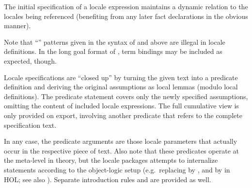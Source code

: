 \begin{isabellebody}
\begin{isamarkuptext}
\begin{description}
\begin{description}
  The initial  specification of a locale expression
  maintains a dynamic relation to the locales being referenced
  (benefiting from any later fact declarations in the obvious manner).

  \end{description}
  
  Note that ``'' patterns given
  in the syntax of \hyperlink{element.assumes}{\mbox{}} and \hyperlink{element.defines}{\mbox{}} above
  are illegal in locale definitions.  In the long goal format of
  , term bindings may be included as expected,
  though.
  
  \medskip Locale specifications are ``closed up'' by
  turning the given text into a predicate definition  and deriving the original assumptions as local lemmas
  (modulo local definitions).  The predicate statement covers only the
  newly specified assumptions, omitting the content of included locale
  expressions.  The full cumulative view is only provided on export,
  involving another predicate  that refers to the complete
  specification text.
  
  In any case, the predicate arguments are those locale parameters
  that actually occur in the respective piece of text.  Also note that
  these predicates operate at the meta-level in theory, but the locale
  packages attempts to internalize statements according to the
  object-logic setup (e.g.\ replacing  by , and
   by  in HOL; see also
  ).  Separate introduction rules  and  are provided as well.
  

\end{description}
\end{isamarkuptext}
\end{isabellebody}
